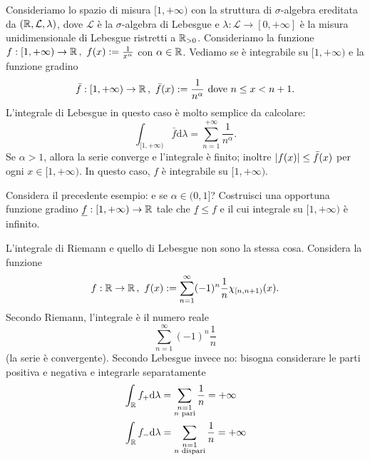 \begin{esempio}
Consideriamo lo spazio di misura \([1, +\infty)\) con la struttura di \(\sigma\)-algebra ereditata da \((\mathbb R, \mathcal L, \lambda)\), dove \(\mathcal L\) è la \(\sigma\)-algebra di Lebesgue e \(\lambda : \mathcal L \to [0, +\infty]\) è la misura unidimensionale di Lebesgue ristretti a \(\mathbb R_{> 0}\). Consideriamo la funzione
\(f : [1, +\infty) \to \mathbb R \,,\ f(x) := \frac1{x^\alpha}\)
con \(\alpha \in \mathbb R\). Vediamo se è integrabile su \([1, +\infty)\) e la funzione gradino
\[\bar f : [1, +\infty) \to \mathbb R\,,\ \bar f(x) := \frac{1}{n^\alpha} \ \text{dove } n \le x < n+1 .\]
L'integrale di Lebesgue in questo caso è molto semplice da calcolare:
\[\int_{[1, +\infty)} \bar f \mathrm d \lambda = \sum_{n = 1}^{+\infty} \frac{1}{n^\alpha} .\]
Se \(\alpha > 1\), allora la serie converge e l'integrale è finito; inoltre \(\left\lvert f(x)\right\rvert\le \bar f(x)\) per ogni \(x \in [1, +\infty)\). In questo caso, \(f\) è integrabile su \([1, +\infty)\).
\end{esempio}

\begin{esercizio}
Considera il precedente esempio: e se \(\alpha \in (0, 1]\)? Costruisci una opportuna funzione gradino \(\underline f : [1, +\infty) \to \mathbb R\) tale che \(\underline f \le f\) e il cui integrale su \([1, +\infty)\) è infinito.
\end{esercizio}

\begin{esempio}
L'integrale di Riemann e quello di Lebesgue non sono la stessa cosa. Considera la funzione
\[f : \mathbb R \to \mathbb R\,,\ f(x) := \sum_{n=1}^\infty (-1)^n \frac1n \chi_{[n, n+1)}(x) .\]
Secondo Riemann, l'integrale è il numero reale
\[\sum_{n=1}^\infty (-1)^n \frac 1n\]
(la serie è convergente). Secondo Lebesgue invece no: bisogna considerare le parti positiva e negativa e integrarle separatamente
\begin{align*}
& \int_\mathbb R f_+ \mathrm d \lambda = \sum_{\substack{n = 1 \\ n \text{ pari}}} \frac 1n  = +\infty\\
& \int_\mathbb R f_- \mathrm d \lambda = \sum_{\substack{n = 1 \\ n \text{ dispari}}} \frac 1n = +\infty
\end{align*}
\end{esempio}

